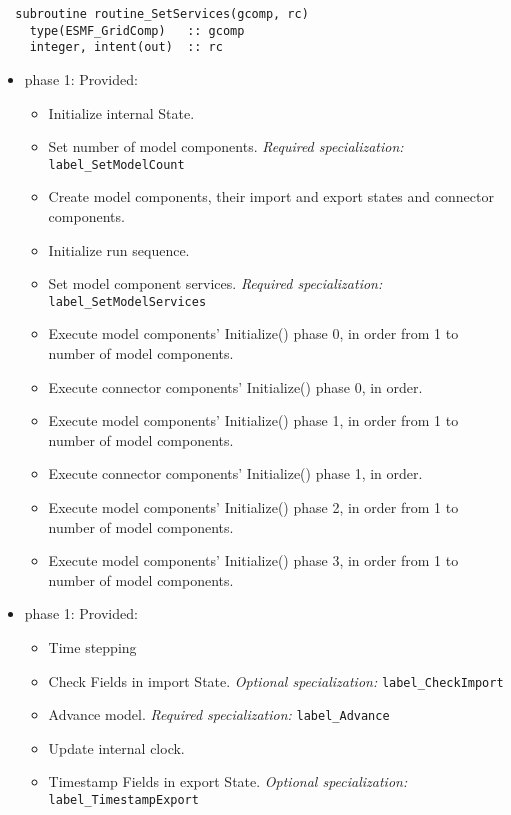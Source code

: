 \begin{verbatim}  subroutine routine_SetServices(gcomp, rc)
    type(ESMF_GridComp)   :: gcomp
    integer, intent(out)  :: rc
\end{verbatim}

\begin{itemize}
\item phase 1: {\sc Provided:}
  \begin{itemize}
  \item Initialize internal State.
  \item Set number of model components. {\it Required specialization:} {\tt label\_SetModelCount}
  \item Create model components, their import and export states and connector components.
  \item Initialize run sequence.
  \item Set model component services. {\it Required specialization:} {\tt label\_SetModelServices}
  \item Execute model components' Initialize() phase 0, in order from 1 to number of model components.
  \item Execute connector components' Initialize() phase 0, in order.
  \item Execute model components' Initialize() phase 1, in order from 1 to number of model components.
  \item Execute connector components' Initialize() phase 1, in order.
  \item Execute model components' Initialize() phase 2, in order from 1 to number of model components.
  \item Execute model components' Initialize() phase 3, in order from 1 to number of model components.
  \end{itemize}  
\end{itemize}

\begin{itemize}
\item phase 1: {\sc Provided:}
  \begin{itemize}
  \item Time stepping 
  \item Check Fields in import State. {\it Optional specialization:} {\tt label\_CheckImport}
  \item Advance model. {\it Required specialization:} {\tt label\_Advance}
  \item Update internal clock.
  \item Timestamp Fields in export State. {\it Optional specialization:} {\tt label\_TimestampExport}
  \end{itemize}    
\end{itemize}

